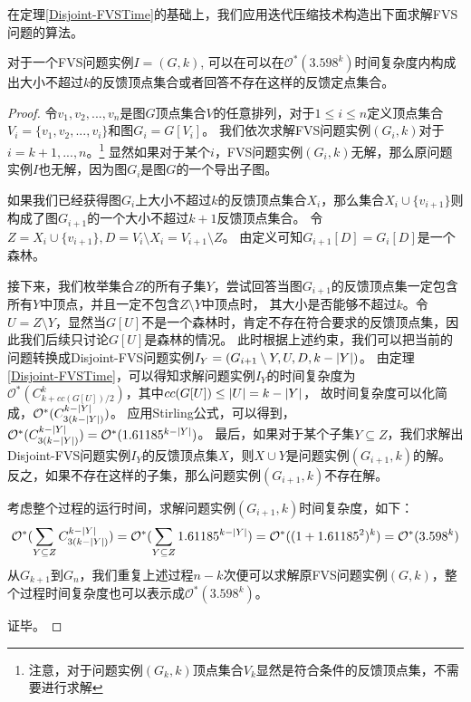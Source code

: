 在定理\ref{Disjoint-FVSTime}的基础上，我们应用迭代压缩技术构造出下面求解FVS问题的算法。
\begin{theorem}
对于一个FVS问题实例$I = (G, k)$, 可以在可以在$\mathcal{O}^*(3.598^k)$时间复杂度内构成出大小不超过$k$的反馈顶点集合或者回答不存在这样的反馈定点集合。
\end{theorem}
\begin{proof}
令$v_1, v_2, ..., v_n$是图$G$顶点集合$V$的任意排列，对于$1 \le i \le n$定义顶点集合$V_i = \{v_1, v_2, ..., v_i\}$和图$G_i = G[V_i]$。
我们依次求解FVS问题实例$(G_i, k)$对于$i = k+1, ..., n$。\footnote{注意，对于问题实例$(G_k, k)$顶点集合$V_k$显然是符合条件的反馈顶点集，不需要进行求解}
显然如果对于某个$i$，FVS问题实例$(G_i, k)$无解，那么原问题实例$I$也无解，因为图$G_i$是图$G$的一个导出子图。

如果我们已经获得图$G_i$上大小不超过$k$的反馈顶点集合$X_i$，那么集合$X_i \cup \{v_{i+1}\}$则构成了图$G_{i+1}$的一个大小不超过$k+1$反馈顶点集合。
令$Z = X_i \cup \{v_{i+1}\}, D = V_i \setminus X_i = V_{i+1} \setminus Z$。
由定义可知$G_{i+1}[D] = G_i[D]$是一个森林。

接下来，我们枚举集合$Z$的所有子集$Y$，尝试回答当图$G_{i+1}$的反馈顶点集一定包含所有$Y$中顶点，并且一定不包含$Z \setminus Y$中顶点时，
其大小是否能够不超过$k$。令$U = Z \setminus Y$，显然当$G[U]$不是一个森林时，肯定不存在符合要求的反馈顶点集，因此我们后续只讨论$G[U]$是森林的情况。
此时根据上述约束，我们可以把当前的问题转换成Disjoint-FVS问题实例$I_Y = (G_{i+1} \setminus Y, U, D, k-\left\vert Y \right\vert)$。
由定理\ref{Disjoint-FVSTime}，可以得知求解问题实例$I_Y$的时间复杂度为$\mathcal{O}^*(C^k_{k + cc(G[U])/2})$，其中$cc(G[U]) \le \left\vert U \right\vert = k - \left\vert Y \right\vert$，
故时间复杂度可以化简成，$\mathcal{O}^*(C^{k - \left\vert Y \right\vert}_{3(k - \left\vert Y \right\vert)})$。
应用Stirling公式，可以得到，$\mathcal{O}^*(C^{k - \left\vert Y \right\vert}_{3(k - \left\vert Y \right\vert)}) = \mathcal{O}^*(1.61185^{k - \left\vert Y \right\vert})$。
最后，如果对于某个子集$Y \subseteq Z$，我们求解出Disjoint-FVS问题实例$I_Y$的反馈顶点集$X$，则$X \cup Y$是问题实例$(G_{i+1}, k)$的解。
反之，如果不存在这样的子集，那么问题实例$(G_{i+1}, k)$不存在解。

考虑整个过程的运行时间，求解问题实例$(G_{i+1}, k)$时间复杂度，如下：
\begin{equation*}
  \mathcal{O}^*(\sum_{Y \subseteq Z}C^{k - \left\vert Y \right\vert}_{3(k - \left\vert Y \right\vert)}) \\
   = \mathcal{O}^*(\sum_{Y \subseteq Z}1.61185^{k - \left\vert Y \right\vert})
   = \mathcal{O}^*((1 + 1.61185^2)^k) = \mathcal{O}^*(3.598^k)
\end{equation*}
从$G_{k+1}$到$G_n$，我们重复上述过程$n - k$次便可以求解原FVS问题实例$(G, k)$，整个过程时间复杂度也可以表示成$\mathcal{O}^*(3.598^k)$。

证毕。
\end{proof}
